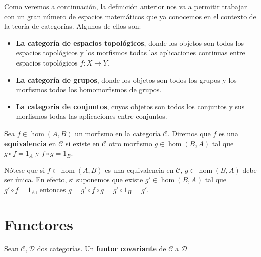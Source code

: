 \begin{ejemplo}
	Como veremos a continuación, la definición anterior nos va a permitir trabajar con un gran número de espacios matemáticos que ya conocemos en el contexto de la teoría de categorías. Algunos de ellos son:
	\begin{itemize}
		\item \textbf{La categoría de espacios topológicos}, donde los objetos son todos los espacios topológicos y los morfismos todas las aplicaciones continuas entre espacios topológicos $f: X \rightarrow Y$.
		\item \textbf{La categoría de grupos}, donde los objetos son todos los grupos y los morfismos todos los homomorfismos de grupos.
		\item \textbf{La categoría de conjuntos}, cuyos objetos son todos los conjuntos y sus morfismos todas las aplicaciones entre conjuntos.
	\end{itemize}
\end{ejemplo}

\begin{definicion}
	Sea $f \in \hom(A,B)$ un morfismo en la categoría $\mathcal{C}$. Diremos que $f$ es una \textbf{equivalencia} en $\mathcal{C}$ si existe en $\mathcal{C}$ otro morfismo $g \in \hom(B,A)$ tal que $g \circ f = 1_A$ y $f \circ g = 1_B$.
\end{definicion}

Nótese que si $f \in \hom(A,B)$ es una equivalencia en $\mathcal{C}$, $g \in \hom(B,A)$ debe ser única. En efecto, si suponemos que existe $g' \in \hom(B,A)$ tal que $g' \circ f = 1_A$, entonces $g = g'\circ f \circ g = g' \circ 1_B = g'$.

\section{Functores}

\begin{definicion}
	Sean $\mathcal{C}, \mathcal{D}$ dos categorías. Un \textbf{funtor covariante} de $\mathcal{C}$ a $\mathcal{D}$
\end{definicion}


\endinput
